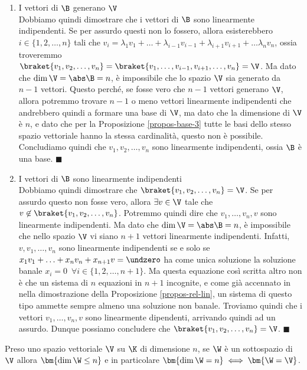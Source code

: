 \documentclass[11pt, a4paper, titlepage, oneside]{scrbook}
\begin{document}
\begin{enumerate}[label=\arabic*°]
    \item I vettori di $\B$ generano $\V$ \\
    Dobbiamo quindi dimostrare che i vettori di $\B$ sono linearmente indipendenti. Se per assurdo questi non lo fossero, allora esisterebbero \mbox{$i \in \{1,2, \ldots, n\}$} tali che \mbox{$v_i = \lambda_1 v_1 + \ldots + \lambda_{i-1} v_{i-1} + \lambda_{i+1} v_{i+1} + \ldots \lambda_n v_n$}, ossia troveremmo $\braket{v_1, v_2, \ldots, v_n} = \braket{v_1, \ldots, v_{i-1}, v_{i+1}, \ldots, v_n} = \V$. 
    Ma dato che $\dim \V = \abs\B = n$, è impossibile che lo spazio $\V$ sia generato da $n-1$ vettori. Questo perché, se fosse vero che $n-1$ vettori generano $\V$, allora potremmo trovare $n-1$ o meno vettori linearmente indipendenti che andrebbero quindi a formare una base di $\V$, ma dato che la dimensione di $\V$ è $n$, e dato che per la Proposizione \ref{propos-base-3} tutte le basi dello stesso spazio vettoriale hanno la stessa cardinalità, questo non è possibile. Concludiamo quindi che $v_1, v_2, \ldots, v_n$ sono linearmente indipendenti, ossia $\B$ è una base. $\blacksquare$
    \item I vettori di $\B$ sono linearmente indipendenti \\
    Dobbiamo quindi dimostrare che $\braket{v_1, v_2, \ldots, v_n} = \V$. Se per assurdo questo non fosse vero, allora $\exists v \in \V$ tale che $v \not\in \braket{v_1, v_2, \ldots, v_n}$. Potremmo quindi dire che $v_1, \ldots, v_n, v$ sono linearmente indipendenti. 
    Ma dato che $\dim \V = \abs\B = n$, è impossibile che nello spazio $\V$ vi siano $n+1$ vettori linearmente indipendenti. Infatti, $v, v_1, \ldots, v_n$ sono linearmente indipendenti se e solo se $x_1 v_1+ \ldots + x_n v_n + x_{n+1} v = \undzero$ ha come unica soluzione la soluzione banale $x_i = 0 \enspace \forall i \in \{1,2, \ldots, n+1\}$.
    Ma questa equazione così scritta altro non è che un sistema di $n$ equazioni in $n+1$ incognite, e come già accennato in nella dimostrazione della Proposizione \ref{propos-rel-lin}, un sistema di questo tipo ammette sempre almeno una soluzione non banale. Troviamo quindi che i vettori $v_1, \ldots, v_n, v$ sono linearmente dipendenti, arrivando quindi ad un assurdo. Dunque possiamo concludere che $\braket{v_1, v_2, \ldots, v_n} = \V$. $\blacksquare$
\end{enumerate}

\begin{Proposizione}[]
\label{propos-dim-spa-vet}
Preso uno spazio vettoriale $\V$ su $\K$ di dimensione $n$, se $\W$ è un sottospazio di $\V$ allora $\bm{\dim \W \leq n}$ e in particolare $\bm{\dim \W = n} \iff \bm{\W = \V}$. 
\end{Proposizione}
\end{document}
